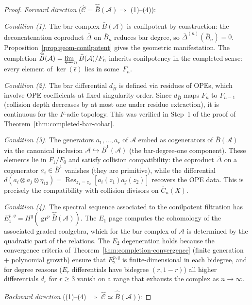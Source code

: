 \begin{proof}
\emph{Forward direction} ($\widehat{\mathcal{C}} = \widehat{\bar{B}}(\mathcal{A}) \Rightarrow$ (1)--(4)):

\emph{Condition (1).} The bar complex $\bar{B}(\mathcal{A})$ is conilpotent by construction: the deconcatenation coproduct $\bar{\Delta}$ on $\bar{B}_n$ reduces bar degree, so $\bar{\Delta}^{(n)}(\bar{B}_n) = 0$.  Proposition~\ref{prop:geom-conilpotent} gives the geometric manifestation.  The completion
$\widehat{\bar{B}}(\mathcal{A}) = \varprojlim_n \bar{B}(\mathcal{A})/F_n$
inherits conilpotency in the completed sense: every element of $\ker(\hat{\epsilon})$ lies in some~$F_n$.

\emph{Condition (2).} The bar differential $d_{\bar{B}}$ is defined via residues of OPEs, which involve OPE coefficients at fixed singularity order.  Since $d_{\bar{B}}$ maps $F_n$ to $F_{n-1}$ (collision depth decreases by at most one under residue extraction), it is continuous for the $F$-adic topology.  This was verified in Step~1 of the proof of Theorem~\ref{thm:completed-bar-cobar}.

\emph{Condition (3).} The generators $a_1, \ldots, a_r$ of $\mathcal{A}$ embed as cogenerators of $\bar{B}(\mathcal{A})$ via the canonical inclusion $\mathcal{A} \hookrightarrow \bar{B}^1(\mathcal{A})$ (the bar-degree-one component).  These elements lie in $F_1/F_0$ and satisfy collision compatibility: the coproduct $\bar{\Delta}$ on a cogenerator $a_i \in \bar{B}^1$ vanishes (they are primitive), while the differential $d(a_i \otimes a_j \otimes \eta_{12}) = \operatorname{Res}_{z_1 = z_2}[a_i(z_1)a_j(z_2)]$ recovers the OPE data.  This is precisely the compatibility with collision divisors on $\overline{C}_n(X)$.

\emph{Condition (4).} The spectral sequence associated
to the conilpotent filtration has
$E_1^{p,q} = H^q(\operatorname{gr}^p
\widehat{\bar{B}}(\mathcal{A}))$.
The $E_1$ page computes the cohomology of the associated graded
coalgebra, which for the bar complex of $\mathcal{A}$ is determined by
the quadratic part of the relations.  The $E_2$ degeneration holds
because the convergence criteria of
Theorem~\ref{thm:completion-convergence} (finite generation +
polynomial growth) ensure that $E_2^{p,q}$ is finite-dimensional in
each bidegree, and for degree reasons ($E_r$ differentials have bidegree
$(r, 1-r)$) all higher differentials $d_r$ for $r \geq 3$ vanish on a
range that exhausts the complex as $n \to \infty$.

\medskip
\emph{Backward direction} ((1)--(4) $\Rightarrow$ $\widehat{\mathcal{C}} \simeq \widehat{\bar{B}}(\mathcal{A})$):


\end{proof}
